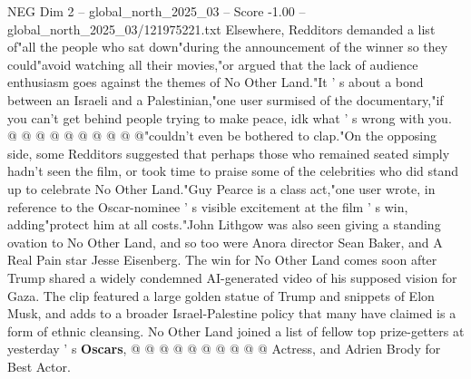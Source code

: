 \begin{textsample}{NEG Dim 2 – global\_north\_2025\_03 – Score -1.00 – global\_north\_2025\_03/121975221.txt}
Elsewhere, Redditors demanded a list of"all the people who sat down"during the announcement of the winner so they could"avoid watching all their movies,"or argued that the lack of audience enthusiasm goes against the themes of No Other Land."It ' s about a bond between an Israeli and a Palestinian,"one user surmised of the documentary,"if you can't get behind people trying to make peace, idk what ' s wrong with you. @ @ @ @ @ @ @ @ @ @"couldn't even be bothered to clap."On the opposing side, some Redditors suggested that perhaps those who remained seated simply hadn't seen the film, or took time to praise some of the celebrities who did stand up to celebrate No Other Land."Guy Pearce is a class act,"one user wrote, in reference to the Oscar-nominee ' s visible excitement at the film ' s win, adding"protect him at all costs."John Lithgow was also seen giving a standing ovation to No Other Land, and so too were Anora director Sean Baker, and A Real Pain star Jesse Eisenberg.
The win for No Other Land comes soon after Trump shared a widely condemned AI-generated video of his supposed vision for Gaza.
The clip featured a large golden statue of Trump and snippets of Elon Musk, and adds to a broader Israel-Palestine policy that many have claimed is a form of ethnic cleansing.
No Other Land joined a list of fellow top prize-getters at yesterday ' s \textbf{Oscars}, @ @ @ @ @ @ @ @ @ @ Actress, and Adrien Brody for Best Actor.

\end{textsample}
